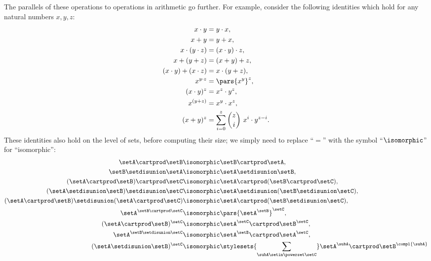 The parallels of these operations to operations in arithmetic go further.
For example, consider the following identities which hold for any natural numbers $x, y, z$: 
\begin{align}
    x \cdot y & = y \cdot x,  \\ 
    x + y & = y + x, \\
    x \cdot (y \cdot z) & = (x \cdot y) \cdot z, \\
    x + (y + z) & = (x + y) + z, \\
    (x \cdot y) + (x \cdot z)  & = x \cdot (y + z), \\
    x^{y \cdot z}                    & = \pars{x^y}^z, \\
    (x \cdot y)^z &= x^z \cdot y^z, \\
    x^{(y + z)}           & = x^y \cdot x^z, \\
    (x + y)^z &= \sum_{i = 0}^z {{z}\choose{i}} \ x^i \cdot y^{z - i}. 
\end{align}
These identities also hold on the level of sets, before computing their size; we simply need to replace ``$=$'' with the symbol ``$\isomorphic$'' for ``isomorphic'':
\begin{align}
    \setA \cartprod \setB & \isomorphic \setB \cartprod \setA,  \\
    \setB \setdisunion \setA & \isomorphic \setA \setdisunion \setB,   \\
    (\setA \cartprod \setB) \cartprod \setC & \isomorphic \setA \cartprod (\setB \cartprod \setC), \\
    (\setA \setdisunion \setB) \setdisunion \setC & \isomorphic \setA \setdisunion (\setB \setdisunion \setC), \\
    (\setA \cartprod \setB) \setdisunion (\setA \cartprod \setC)  & \isomorphic \setA \cartprod (\setB \setdisunion \setC), \\
    \setA^{\setB \cartprod \setC}                    & \isomorphic \pars{\setA^\setB}^\setC, \\
    (\setA \cartprod \setB)^{\setC} & \isomorphic  \setA^\setC \cartprod \setB^\setC, \\
    \setA^{\setB \setdisunion \setC}           & \isomorphic \setA^\setB \cartprod \setA^\setC, \\
    (\setA \setdisunion \setB)^{\setC} & \isomorphic \stylesets{\sum_{\subA \setin \powerset \setC}} \setA^\subA \cartprod \setB^{\compl{\subA}} 
\end{align}


